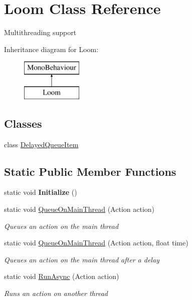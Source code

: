 \hypertarget{class_loom}{}\section{Loom Class Reference}
\label{class_loom}


Multithreading support  


Inheritance diagram for Loom\+:\begin{figure}[H]
\begin{center}
\leavevmode
\includegraphics[height=2.000000cm]{class_loom}
\end{center}
\end{figure}
\subsection*{Classes}
\begin{DoxyCompactItemize}
\item 
class \hyperlink{class_loom_1_1_delayed_queue_item}{Delayed\+Queue\+Item}
\end{DoxyCompactItemize}
\subsection*{Static Public Member Functions}
\begin{DoxyCompactItemize}
\item 
\mbox{\label{class_loom_aa8179ae2588826a3feb739b2540e710a}} 
static void {\bfseries Initialize} ()
\item 
static void \hyperlink{class_loom_a0d38a65c449aacb444a14074f3d62574}{Queue\+On\+Main\+Thread} (Action action)
\begin{DoxyCompactList}\small\item\em Queues an action on the main thread \end{DoxyCompactList}\item 
static void \hyperlink{class_loom_a9003659e5b32d18ddb3c9204dcff343f}{Queue\+On\+Main\+Thread} (Action action, float time)
\begin{DoxyCompactList}\small\item\em Queues an action on the main thread after a delay \end{DoxyCompactList}\item 
static void \hyperlink{class_loom_a96dca2cf633909a32613b23bf7006f80}{Run\+Async} (Action action)
\begin{DoxyCompactList}\small\item\em Runs an action on another thread \end{DoxyCompactList}\end{DoxyCompactItemize}
